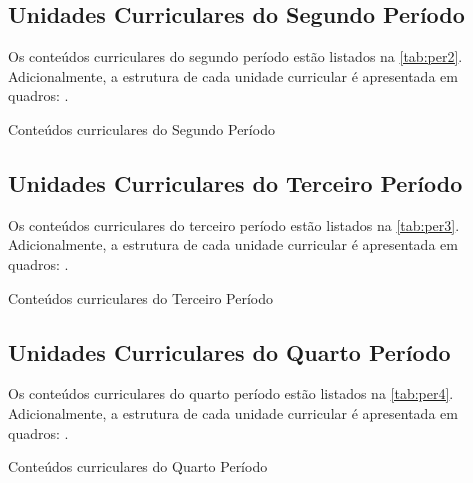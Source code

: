 \subsection{Unidades Curriculares do Segundo Período}

Os conteúdos curriculares do segundo período estão listados na \autoref{tab:per2}. Adicionalmente, a estrutura de cada unidade curricular é apresentada em quadros: .

\begin{table}[!htb]
	\centering\footnotesize
	\caption{Conteúdos curriculares do Segundo Período}
	\label{tab:per2}
\end{table}

\clearpage

\subsection{Unidades Curriculares do Terceiro Período}

Os conteúdos curriculares do terceiro período estão listados na \autoref{tab:per3}. Adicionalmente, a estrutura de cada unidade curricular é apresentada em quadros: .

\begin{table}[!htb]
	\centering\footnotesize
	\caption{Conteúdos curriculares do Terceiro Período}
	\label{tab:per3}
\end{table}

\clearpage

\subsection{Unidades Curriculares do Quarto Período}

Os conteúdos curriculares do quarto período estão listados na \autoref{tab:per4}. Adicionalmente, a estrutura de cada unidade curricular é apresentada em quadros: .

\begin{table}[!htb]
	\centering\footnotesize
	\caption{Conteúdos curriculares do Quarto Período}
	\label{tab:per4}
\end{table}

